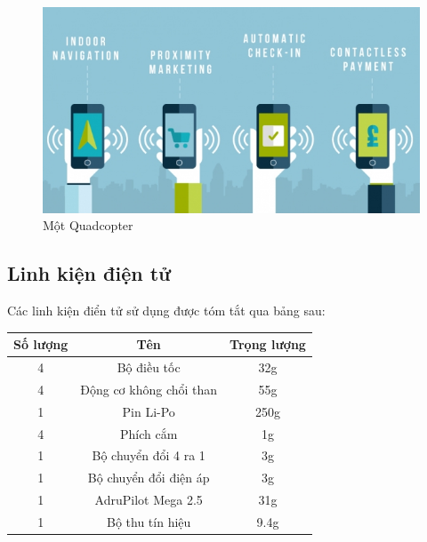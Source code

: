        \begin{figure}[h!]
	        	\begin{center}
	        		\includegraphics[scale=0.8]{images/retail.png}
	        		\caption{Một Quadcopter}
	        	\end{center}
        \end{figure}
        
    	\subsection{Linh kiện điện tử}
Các linh kiện điển tử sử dụng được tóm tắt qua bảng sau:
\begin{tabular}{|c|c|c|}
\hline 
Số lượng & Tên & Trọng lượng \\ 
\hline 
4 & Bộ điều tốc & 32g \\ 
\hline 
4 & Động cơ không chổi than & 55g \\ 
\hline 
1 & Pin Li-Po & 250g \\ 
\hline 
4 & Phích cắm & 1g \\ 
\hline 
1 & Bộ chuyển đổi 4 ra 1 & 3g \\ 
\hline 
1 & Bộ chuyển đổi điện áp & 3g \\ 
\hline 
1 & AdruPilot Mega 2.5 & 31g \\ 
\hline 
1 & Bộ thu tín hiệu & 9.4g \\ 
\hline 
\end{tabular} 

